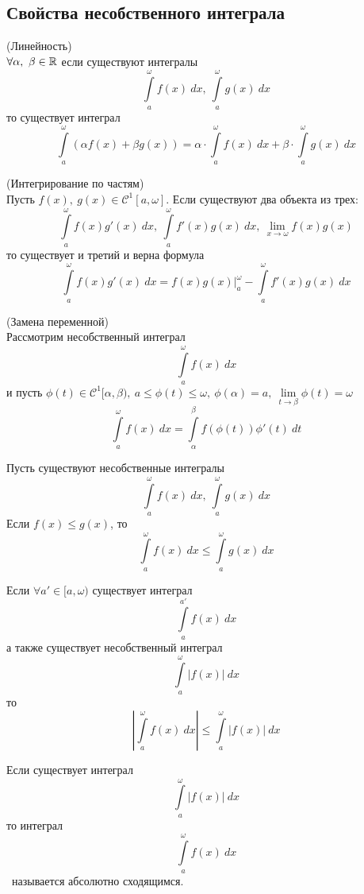 \subsection{Свойства несобственного интеграла}
\setcounter{thmcount}{0}
\begin{numtheorem}
    (Линейность)\\
    $\forall \alpha,\ \beta\in \mathbb{R}$ если существуют интегралы
    \[\int\limits_{a}^{\omega}f(x)\ dx,\ \int\limits_{a}^{\omega}g(x)\ dx\]
    то существует интеграл
    \[\int\limits_{a}^{\omega}(\alpha f(x)+\beta g(x))=\alpha\cdot \int\limits_{a}^{\omega}f(x)\ dx+\beta\cdot \int\limits_{a}^{\omega}g(x)\ dx\]
\end{numtheorem}
\begin{numtheorem}
    (Интегрирование по частям)\\
    Пусть $f(x),\ g(x)\in \mathcal{C}^1[a,\omega]$. Если существуют два объекта из трех:
    \[\int\limits_{a}^{\omega} f(x)g'(x)\ dx,\ \int\limits_{a}^{\omega}f'(x)g(x)\ dx,\ \lim\limits_{x\to \omega}f(x)g(x)\]
    то существует и третий и верна формула
    \[\int\limits_{a}^{\omega}f(x)g'(x)\ dx=f(x)g(x)|_a^{\omega}-\int\limits_{a}^{\omega}f'(x)g(x)\ dx\]
\end{numtheorem}  
\begin{numtheorem}
    (Замена переменной)\\
    Рассмотрим несобственный интеграл 
    \[\int\limits_{a}^{\omega}f(x)\ dx\]
    и пусть $\phi(t)\in \mathcal{C}^1[\alpha,\beta),\ a\leq \phi(t)\leq \omega,\ \phi(\alpha)=a,\ \lim\limits_{t\to \beta}\phi(t)=\omega$
    \[\int\limits_{a}^{\omega}f(x)\ dx=\int\limits_{\alpha}^{\beta} f(\phi(t))\phi'(t)\ dt\]
\end{numtheorem} 
\begin{numtheorem}
    Пусть существуют несобственные интегралы
    \[\int\limits_{a}^{\omega}f(x)\ dx,\ \int\limits_{a}^{\omega}g(x)\ dx\]
    Если $f(x)\leq g(x)$, то
    \[\int\limits_{a}^{\omega}f(x)\ dx\leq \int\limits_{a}^{\omega}g(x)\ dx\]
\end{numtheorem} 
\begin{numtheorem}
    Если $\forall a'\in [a, \omega)$ существует интеграл
    \[\int\limits_{a}^{a'}f(x)\ dx\]
    а также существует несобственный интеграл
    \[\int\limits_{a}^{\omega}|f(x)|\ dx\]
    то
    \[\left|\int\limits_{a}^{\omega}f(x)\ dx\right|\leq \int\limits_{a}^{\omega}|f(x)|\ dx\]
\end{numtheorem} 
\begin{definition}
    Если существует интеграл
    \[\int\limits_{a}^{\omega}|f(x)|\ dx\]
    то интеграл
    \[\int\limits_{a}^{\omega}f(x)\ dx\]\
    называется абсолютно сходящимся.
\end{definition} 
